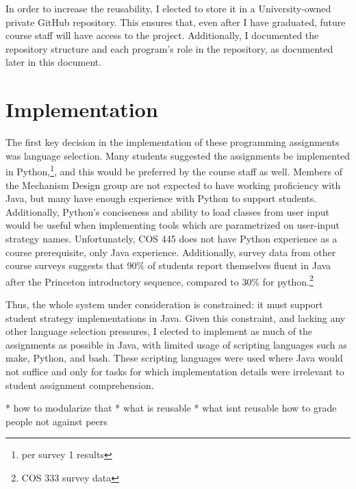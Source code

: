 \documentclass[pageno]{jpaper}
\begin{document}
In order to increase the reusability, I elected to store it in a University-owned private GitHub repository.
This ensures that, even after I have graduated, future course staff will have access to the project.
Additionally, I documented the repository structure and each program's role in the repository, as documented later in this document.

\section*{Implementation}
The first key decision in the implementation of these programming assignments was language selection.
Many students suggested the assignments be implemented in Python,\footnote{per survey 1 results}, and this would be preferred by the course staff as well.
Members of the Mechanism Design group are not expected to have working proficiency with Java, but many have enough experience with Python to support students.
Additionally, Python's conciseness and ability to load classes from user input would be useful when implementing tools which are parametrized on user-input strategy names.
Unfortunately, COS 445 does not have Python experience as a course prerequisite, only Java experience.
Additionally, survey data from other course surveys suggests that 90\% of students report themselves fluent in Java after the Princeton introductory sequence, compared to 30\% for python.\footnote{COS 333 survey data}

Thus, the whole system under consideration is constrained: it must support student strategy implementations in Java.
Given this constraint, and lacking any other language selection pressures, I elected to implement as much of the assignments as possible in Java, with limited usage of scripting languages such as make, Python, and bash.
These scripting languages were used where Java would not suffice and only for tasks for which implementation details were irrelevant to student assignment comprehension.

* how to modularize that
* what is reusable
* what isnt reusable
how to grade people not against peers
\end{document}
